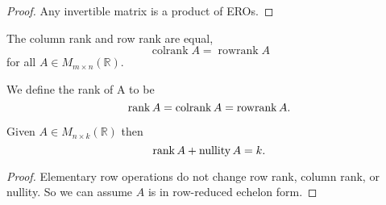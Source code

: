 \begin{proof}
    Any invertible matrix is a product of EROs.
\end{proof}

    

\begin{theorem}
    The column rank and row rank are equal, \[\operatorname{colrank}{A} = \operatorname{rowrank}{A}\] for all $A \in M_{m \times n}(\mathbb{R})$.
\end{theorem}

\begin{definition}
    We define the rank of A to be \[\operatorname{rank}{A} = \operatorname{colrank}{A} = \operatorname{rowrank}{A}.\]
\end{definition}

\begin{theorem}
    Given $A \in M_{n \times k}(\mathbb{R})$ then \[\operatorname{rank}{A} + \operatorname{nullity}{A} = k.\]
\end{theorem}

\begin{proof}
    Elementary row operations do not change row rank, column rank, or nullity. So we can assume $A$ is in row-reduced echelon form.
\end{proof}
